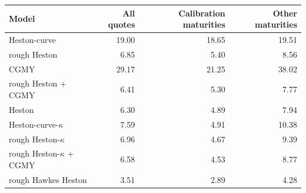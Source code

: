 \begin{tabular}{lrrr}
\toprule
Model & All quotes & Calibration maturities & Other maturities\\
\midrule
Heston-curve & 19.00 & 18.65 & 19.51\\
rough Heston & 6.85 & 5.40 & 8.56\\
CGMY & 29.17 & 21.25 & 38.02\\
rough Heston + CGMY & 6.41 & 5.30 & 7.77\\
\addlinespace
Heston & 6.30 & 4.89 & 7.94\\
Heston-curve-$\kappa$ & 7.59 & 4.91 & 10.38\\
rough Heston-$\kappa$ & 6.96 & 4.67 & 9.39\\
rough Heston-$\kappa$ + CGMY & 6.58 & 4.53 & 8.77\\
rough Hawkes Heston & 3.51 & 2.89 & 4.28\\
\bottomrule
\end{tabular}
